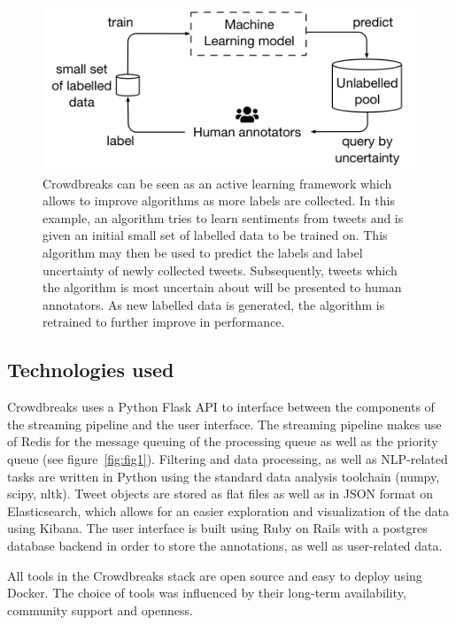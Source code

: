 \documentclass[a4paper, 11pt]{article}
\begin{document}
\begin{figure}[!ht]
\centering
\includegraphics{figures/fig3.png}
  \caption{
    Crowdbreaks can be seen as an active learning framework which allows to improve algorithms as more labels are collected.
    In this example, an algorithm tries to learn sentiments from tweets and is given an initial small set of labelled data to be trained on. 
    This algorithm may then be used to predict the labels and label uncertainty of newly collected tweets.
    Subsequently, tweets which the algorithm is most uncertain about will be presented to human annotators.
    As new labelled data is generated, the algorithm is retrained to further improve in performance.
  }
  \label{fig:fig3}
\end{figure}


\subsection{Technologies used}
Crowdbreaks uses a Python Flask API to interface between the components of the streaming pipeline and the user interface.
The streaming pipeline makes use of Redis for the message queuing of the processing queue as well as the priority queue (see figure~\ref{fig:fig1}).
Filtering and data processing, as well as NLP-related tasks are written in Python using the standard data analysis toolchain (numpy, scipy, nltk). 
Tweet objects are stored as flat files as well as in JSON format on Elasticsearch, which allows for an easier exploration and visualization of the data using Kibana.
The user interface is built using Ruby on Rails with a postgres database backend in order to store the annotations, as well as user-related data.\par
All tools in the Crowdbreaks stack are open source and easy to deploy using Docker. The choice of tools was influenced by their long-term availability, community support and openness. 
\end{document}

